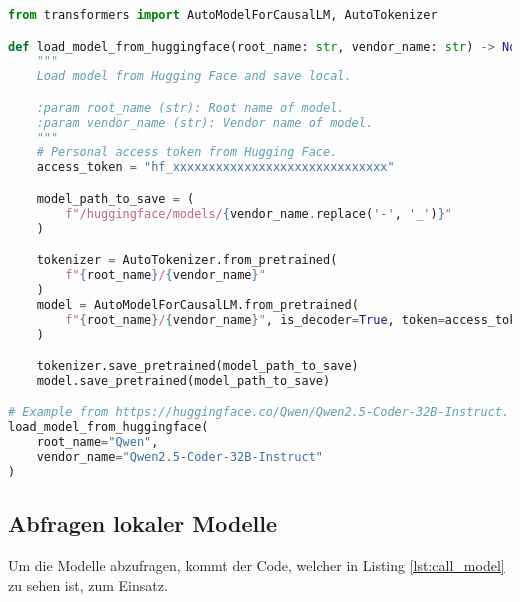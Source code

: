 \begin{lstlisting}[language=python,caption={Laden der Modelle von Hugging Face und lokal speichern},label=lst:download_hugging_face_model]
from transformers import AutoModelForCausalLM, AutoTokenizer

def load_model_from_huggingface(root_name: str, vendor_name: str) -> None:
    """
    Load model from Hugging Face and save local.

    :param root_name (str): Root name of model.
    :param vendor_name (str): Vendor name of model.
    """
    # Personal access token from Hugging Face.
    access_token = "hf_xxxxxxxxxxxxxxxxxxxxxxxxxxxxxx"

    model_path_to_save = (
        f"/huggingface/models/{vendor_name.replace('-', '_')}"
    )

    tokenizer = AutoTokenizer.from_pretrained(
        f"{root_name}/{vendor_name}"
    )
    model = AutoModelForCausalLM.from_pretrained(
        f"{root_name}/{vendor_name}", is_decoder=True, token=access_token
    )

    tokenizer.save_pretrained(model_path_to_save)
    model.save_pretrained(model_path_to_save)

# Example from https://huggingface.co/Qwen/Qwen2.5-Coder-32B-Instruct.
load_model_from_huggingface(
    root_name="Qwen",
    vendor_name="Qwen2.5-Coder-32B-Instruct"
)
\end{lstlisting}

\subsection{Abfragen lokaler Modelle}
Um die Modelle abzufragen, kommt der Code, welcher in Listing \ref{lst:call_model} zu sehen ist, zum Einsatz.

